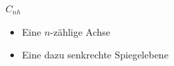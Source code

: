 \begin{frame}[t]
\begin{columns}[t,onlytextwidth]
\begin{column}{0.33\textwidth}
\begin{block}{$C_{nh}$}
\begin{center}
\end{center}
\begin{itemize}
\item Eine $n$-zählige Achse
\item Eine dazu senkrechte Spiegelebene
\end{itemize}
\end{block}
\end{column}
\end{columns}
\end{frame}
\egroup
